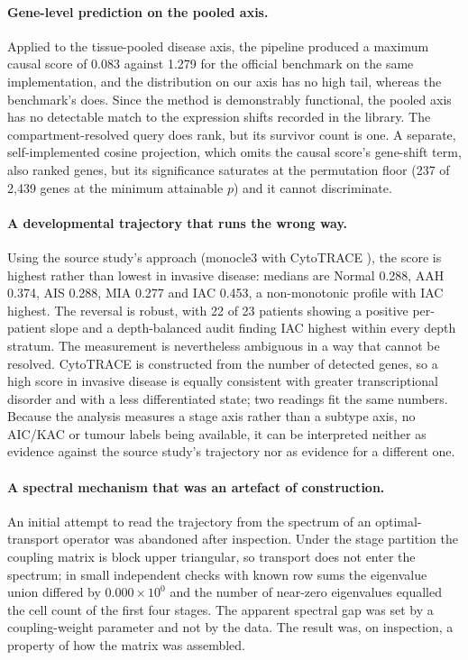 \paragraph{Gene-level prediction on the pooled axis.} Applied to the tissue-pooled disease
axis, the pipeline produced a maximum causal score of 0.083 against 1.279 for the official
benchmark on the same implementation, and the distribution on our axis has no high tail,
whereas the benchmark's does. Since the method is demonstrably functional, the pooled axis
has no detectable match to the expression shifts recorded in the library. The
compartment-resolved query does rank, but its survivor count is one. A separate,
self-implemented cosine projection, which omits the causal score's gene-shift term, also
ranked genes, but its significance saturates at the permutation floor (237 of 2,439 genes at
the minimum attainable $p$) and it cannot discriminate.

\paragraph{A developmental trajectory that runs the wrong way.} Using the source study's
approach (monocle3 \citep{cao2019monocle3} with CytoTRACE \citep{gulati2020cytotrace}), the
score is highest rather than lowest in invasive disease: medians are Normal 0.288, AAH
0.374, AIS 0.288, MIA 0.277 and IAC 0.453, a non-monotonic profile with IAC highest. The
reversal is robust, with 22 of 23 patients showing a positive per-patient slope and a
depth-balanced audit finding IAC highest within every depth stratum. The measurement is
nevertheless ambiguous in a way that cannot be resolved. CytoTRACE is constructed from the
number of detected genes, so a high score in invasive disease is equally consistent with
greater transcriptional disorder and with a less differentiated state; two readings fit the
same numbers. Because the analysis measures a stage axis rather than a subtype axis, no
AIC/KAC or tumour labels being available, it can be interpreted neither as evidence against
the source study's trajectory nor as evidence for a different one.

\paragraph{A spectral mechanism that was an artefact of construction.} An initial attempt to
read the trajectory from the spectrum of an optimal-transport operator
\citep{schiebinger2019wot,lange2022cellrank} was abandoned after inspection. Under the stage
partition the coupling matrix is block upper triangular, so transport does not enter the
spectrum; in small independent checks with known row sums the eigenvalue union differed by
$0.000\times10^{0}$ and the number of near-zero eigenvalues equalled the cell count of the
first four stages. The apparent spectral gap was set by a coupling-weight parameter and not
by the data. The result was, on inspection, a property of how the matrix was assembled.


